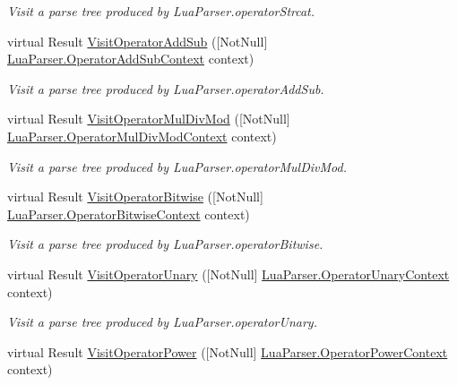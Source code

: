 \begin{DoxyCompactItemize}
\begin{DoxyCompactList}\small\item\em Visit a parse tree produced by Lua\+Parser.\+operator\+Strcat. \end{DoxyCompactList}\item 
virtual Result \mbox{\hyperlink{classzlua_1_1_lua_base_visitor_ac4ab12c3ec18948f72f8f04ba0df85dd}{Visit\+Operator\+Add\+Sub}} (\mbox{[}Not\+Null\mbox{]} \mbox{\hyperlink{classzlua_1_1_lua_parser_1_1_operator_add_sub_context}{Lua\+Parser.\+Operator\+Add\+Sub\+Context}} context)
\begin{DoxyCompactList}\small\item\em Visit a parse tree produced by Lua\+Parser.\+operator\+Add\+Sub. \end{DoxyCompactList}\item 
virtual Result \mbox{\hyperlink{classzlua_1_1_lua_base_visitor_ac08ae206c958ce20c6774f14b31615f8}{Visit\+Operator\+Mul\+Div\+Mod}} (\mbox{[}Not\+Null\mbox{]} \mbox{\hyperlink{classzlua_1_1_lua_parser_1_1_operator_mul_div_mod_context}{Lua\+Parser.\+Operator\+Mul\+Div\+Mod\+Context}} context)
\begin{DoxyCompactList}\small\item\em Visit a parse tree produced by Lua\+Parser.\+operator\+Mul\+Div\+Mod. \end{DoxyCompactList}\item 
virtual Result \mbox{\hyperlink{classzlua_1_1_lua_base_visitor_a024ddded01656d54d3819ca2f1e95e4e}{Visit\+Operator\+Bitwise}} (\mbox{[}Not\+Null\mbox{]} \mbox{\hyperlink{classzlua_1_1_lua_parser_1_1_operator_bitwise_context}{Lua\+Parser.\+Operator\+Bitwise\+Context}} context)
\begin{DoxyCompactList}\small\item\em Visit a parse tree produced by Lua\+Parser.\+operator\+Bitwise. \end{DoxyCompactList}\item 
virtual Result \mbox{\hyperlink{classzlua_1_1_lua_base_visitor_a3859047d2b178e3e90b387b1f694b496}{Visit\+Operator\+Unary}} (\mbox{[}Not\+Null\mbox{]} \mbox{\hyperlink{classzlua_1_1_lua_parser_1_1_operator_unary_context}{Lua\+Parser.\+Operator\+Unary\+Context}} context)
\begin{DoxyCompactList}\small\item\em Visit a parse tree produced by Lua\+Parser.\+operator\+Unary. \end{DoxyCompactList}\item 
virtual Result \mbox{\hyperlink{classzlua_1_1_lua_base_visitor_a9fae59028299794afc9f4cbaa8db8cb9}{Visit\+Operator\+Power}} (\mbox{[}Not\+Null\mbox{]} \mbox{\hyperlink{classzlua_1_1_lua_parser_1_1_operator_power_context}{Lua\+Parser.\+Operator\+Power\+Context}} context)

\end{DoxyCompactItemize}
